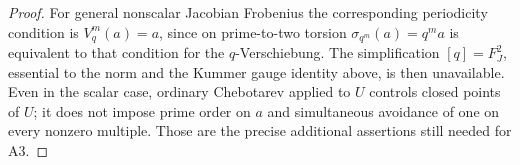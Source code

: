\begin{proof}
For general nonscalar Jacobian Frobenius the corresponding
periodicity condition is \(V_q^m(a)=a\), since on prime-to-two
torsion \(\sigma_{q^m}(a)=q^m a\) is equivalent to that
condition for the \(q\)-Verschiebung.
The simplification \([q]=F_J^2\), essential to the norm
and the Kummer gauge identity above, is then unavailable.
Even in the scalar case, ordinary Chebotarev applied to
\(U\) controls closed points of \(U\); it does not impose
prime order on \(a\) and simultaneous avoidance of one
on every nonzero multiple. Those are the precise additional
assertions still needed for A3.
\end{proof}

